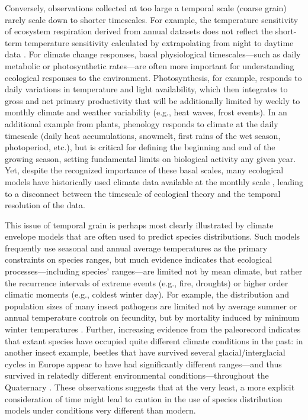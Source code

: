 \documentclass[11pt,a4paper,oneside]{article}
\begin{document}
Conversely, observations collected at too large a temporal scale (coarse grain) rarely scale down to shorter timescales. For example, the temperature sensitivity of ecosystem respiration derived from annual datasets does not reflect the short-term temperature sensitivity calculated by extrapolating from night to daytime data \citep{Reichstein2005}. For climate change responses, basal physiological timescales---such as daily metabolic or photosynthetic rates---are often more important for understanding ecological responses to the environment. Photosynthesis, for example, responds to daily variations in temperature and light availability, which then integrates to gross and net primary productivity that will be additionally limited by weekly to monthly climate and weather variability (e.g., heat waves, frost events).  In an additional example from plants, phenology responds to climate at the daily timescale (daily heat accumulations, snowmelt, first rains of the wet season, photoperiod, etc.), but is critical for defining the beginning and end of the growing season, setting fundamental limits on biological activity any given year. Yet, despite the recognized importance of these basal scales, many ecological models have historically used climate data available at the monthly scale \citep{Sitch2003}, leading to a disconnect between the timescale of ecological theory and the temporal resolution of the data.

This issue of temporal grain is perhaps most clearly illustrated by climate envelope models that are often used to predict species distributions. Such models frequently use seasonal and annual average temperatures as the primary constraints on species ranges, but much evidence indicates that ecological processes---including species' ranges---are limited not by mean climate, but rather the recurrence intervals of extreme events (e.g., fire, droughts) or higher order climatic moments (e.g., coldest winter day). For example, the distribution and population sizes of many insect pathogens are limited not by average summer or annual temperature controls on fecundity, but by mortality induced by minimum winter temperatures \citep{weed2013}. Further, increasing evidence from the paleorecord indicates that extant species have occupied quite different climate conditions in the past: in another insect example, beetles that have survived several glacial/interglacial cycles in Europe appear to have had significantly different ranges---and thus survived in relatedly different environmental conditions---throughout the Quaternary \citep{Abellan2011}. These observations suggests that at the very least, a more explicit consideration of time might lead to caution in the use of species distribution models under conditions very different than modern. 
\end{document}
